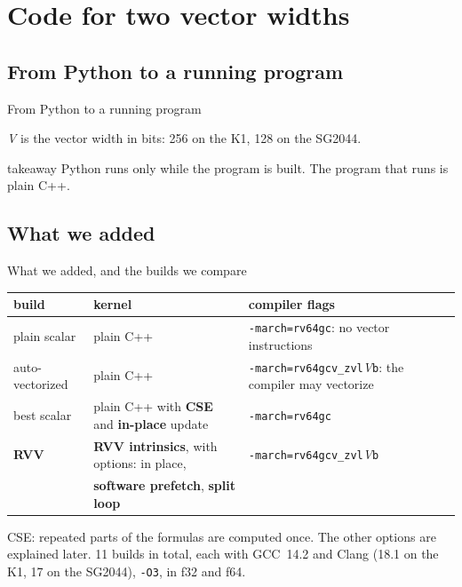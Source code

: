 \documentclass[aspectratio=169,10pt,t]{beamer}
\newcommand{\term}[1]{\textcolor{psblue!85!black}{\textbf{#1}}} %
\newcommand{\code}[1]{\texttt{#1}}
\newcommand{\takeaway}[1]{\par\vfill
  \begin{beamercolorbox}[wd=\textwidth,sep=4pt,rounded=true]{takeaway}
    \small #1
  \end{beamercolorbox}}
\begin{document}
\section[Code for two widths]{Code for two vector widths}
\subsection{From Python to a running program}

\begin{frame}{From Python to a running program}
  \vspace{1mm}
  \centering
  \vspace{1mm}
  \raggedright{\scriptsize\color{psgray}\textit{V} is the vector width in bits: 256 on the K1, 128 on the SG2044.\par}
  \takeaway{Python runs only while the program is built. The program that runs is plain C++.}
\end{frame}

\subsection{What we added}
\begin{frame}{What we added, and the builds we compare}
  \vspace{2mm}
  \centering

  \vspace{4mm}
  {\footnotesize\renewcommand{\arraystretch}{1.12}
  \begin{tabular}{@{}lll@{}}
    \toprule
    \textbf{build} & \textbf{kernel} & \textbf{compiler flags}\\
    \midrule
    plain scalar & plain C++ & \code{-march=rv64gc}: no vector instructions\\
    auto-vectorized & plain C++ & \code{-march=rv64gcv\_zvl}\textit{V}\code{b}: the compiler may vectorize\\
    best scalar & plain C++ with \term{CSE} and \term{in-place} update & \code{-march=rv64gc}\\
    \textbf{RVV} & \textbf{RVV intrinsics}, with options: in place, & \code{-march=rv64gcv\_zvl}\textit{V}\code{b}\\
    & \hspace{1em}\term{software prefetch}, \term{split loop} & \\
    \bottomrule
  \end{tabular}\par}

  \vspace{2mm}
  {\scriptsize\color{psgray}CSE: repeated parts of the formulas are computed once. The other options are explained
  later. 11 builds in total, each with GCC~14.2 and Clang (18.1 on the K1, 17 on the SG2044), \code{-O3}, in f32
  and f64.\par}
\end{frame}
\end{document}
